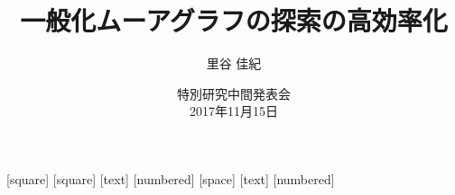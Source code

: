 \usepackage{amsmath,amsthm,amssymb}
\usepackage{graphicx}
\usepackage{subfig}
\usepackage{bxdpx-beamer}
\usepackage{pxjahyper}
\usepackage{appendixnumberbeamer}

[square]
[square]
[text]
\renewcommand{\kanjifamilydefault}{\gtdefault}
\renewcommand{\familydefault}{\sfdefault}
[numbered]
[space]
[text]
[numbered]
\renewcommand{\figurename}{図}
\renewcommand{\tablename}{表}
\renewcommand{\appendixname}{補足}
\theoremstyle{definition}
\newtheorem{thm}{定理}
\newtheorem{conj}[thm]{予想}
\graphicspath{{../res/figure/}{../res/table/}}
\makeatletter
{}
\makeatother


\title{一般化ムーアグラフの探索の高効率化}
\author{里谷 佳紀}
\date[特別研究中間発表会]{特別研究中間発表会 \\ 2017年11月15日}
